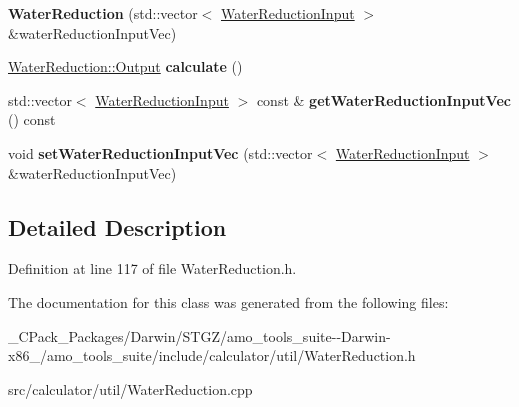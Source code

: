 \begin{DoxyCompactItemize}
\item 
\mbox{\label{class_water_reduction_a51ac64467b3fd5dbb4a1f916a3d61b84}} 
{\bfseries Water\+Reduction} (std\+::vector$<$ \hyperlink{class_water_reduction_input}{Water\+Reduction\+Input} $>$ \&water\+Reduction\+Input\+Vec)
\item 
\mbox{\label{class_water_reduction_a24453d098797a0b1a1f69836abff4281}} 
\hyperlink{struct_water_reduction_1_1_output}{Water\+Reduction\+::\+Output} {\bfseries calculate} ()
\item 
\mbox{\label{class_water_reduction_ac2c0497b047722a30db004d460f7520d}} 
std\+::vector$<$ \hyperlink{class_water_reduction_input}{Water\+Reduction\+Input} $>$ const  \& {\bfseries get\+Water\+Reduction\+Input\+Vec} () const
\item 
\mbox{\label{class_water_reduction_a29b38ac42b6c9145e0765818bb8f5924}} 
void {\bfseries set\+Water\+Reduction\+Input\+Vec} (std\+::vector$<$ \hyperlink{class_water_reduction_input}{Water\+Reduction\+Input} $>$ \&water\+Reduction\+Input\+Vec)
\end{DoxyCompactItemize}


\subsection{Detailed Description}


Definition at line 117 of file Water\+Reduction.\+h.



The documentation for this class was generated from the following files\+:\begin{DoxyCompactItemize}
\item 
\+\_\+\+C\+Pack\+\_\+\+Packages/\+Darwin/\+S\+T\+G\+Z/amo\+\_\+tools\+\_\+suite-\/-\/\+Darwin-\/x86\+\_/amo\+\_\+tools\+\_\+suite/include/calculator/util/Water\+Reduction.\+h\item 
src/calculator/util/Water\+Reduction.\+cpp\end{DoxyCompactItemize}
